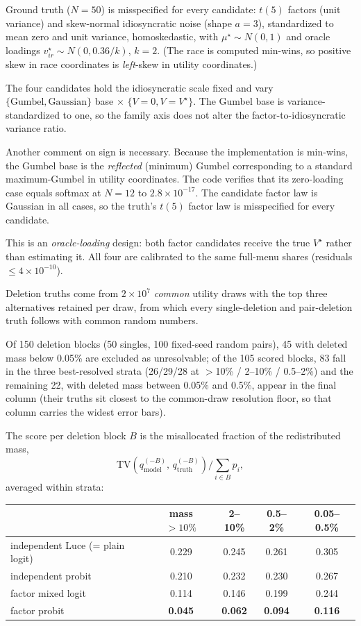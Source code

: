\documentclass[12pt]{article}
\theoremstyle{remark}
\begin{document}
Ground truth ($N = 50$) is misspecified for every candidate: $t(5)$ factors
(unit variance) and skew-normal idiosyncratic noise (shape $a = 3$),
standardized to mean zero and unit variance, homoskedastic, with $\mu^\star
\sim N(0,1)$ and oracle loadings $v^\star_{ir} \sim N(0, 0.36/k)$, $k=2$.
(The race is computed min-wins, so positive skew in race coordinates is
\emph{left}-skew in utility coordinates.)

The four candidates hold the idiosyncratic scale fixed and vary
$\{\text{Gumbel}, \text{Gaussian}\}$ base $\times$ $\{V = 0, V =
V^\star\}$. The Gumbel base is variance-standardized to one, so the
family axis does not alter the factor-to-idiosyncratic variance ratio.

Another comment on sign is necessary. Because the implementation is min-wins, the Gumbel base is the
\emph{reflected} (minimum) Gumbel corresponding to a standard
maximum-Gumbel in utility coordinates. The code verifies that
its zero-loading case equals softmax at $N=12$ to $2.8\times10^{-17}$.
The candidate factor law is Gaussian in all cases, so the truth's $t(5)$
factor law is misspecified for every candidate.

This is an \emph{oracle-loading} design: both factor
candidates receive the true $V^\star$ rather than estimating it. All four
are calibrated to the same full-menu shares (residuals $\le
4\times10^{-10}$).

Deletion truths come from $2\times10^7$ \emph{common} utility draws with
the top three alternatives retained per draw, from which every
single-deletion and pair-deletion truth follows with common random numbers.

Of 150 deletion blocks (50 singles, 100 fixed-seed random pairs), 45 with
deleted mass below 0.05\% are excluded as unresolvable; of the 105 scored
blocks, 83 fall in the three best-resolved strata (26/29/28 at $>$10\% /
2--10\% / 0.5--2\%) and the remaining 22, with deleted mass between
0.05\% and 0.5\%, appear in the final column (their truths sit closest to
the common-draw resolution floor, so that column carries the widest error
bars).

The score per deletion block $B$ is the
misallocated fraction of the redistributed mass,
\[
\mathrm{TV}\!\left(q^{(-B)}_{\mathrm{model}},\,
q^{(-B)}_{\mathrm{truth}}\right) \Big/ \textstyle\sum_{i \in B} p_i ,
\]
averaged within strata:

\begin{center}
\begin{tabular}{lcccc}
\toprule
 & mass $>10\%$ & 2--10\% & 0.5--2\% & 0.05--0.5\% \\
\midrule
independent Luce (= plain logit) & 0.229 & 0.245 & 0.261 & 0.305 \\
independent probit & 0.210 & 0.232 & 0.230 & 0.267 \\
factor mixed logit & 0.114 & 0.146 & 0.199 & 0.244 \\
factor probit & \textbf{0.045} & \textbf{0.062} & \textbf{0.094} & \textbf{0.116} \\
\bottomrule
\end{tabular}
\end{center}
\end{document}
